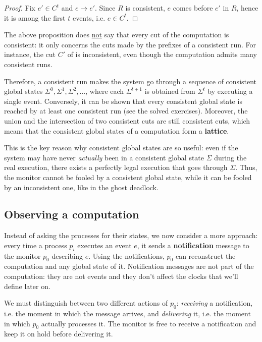 \begin{proof}
  Fix $e' \in C^t$ and $e \to e'$. Since $R$ is consistent, $e$ comes before $e'$ in $R$, hence it is among the first $t$ events, i.e. $e \in C^t$.
\end{proof}

\begin{framedobs}{}
  The above proposition does \underline{not} say that every cut of the computation is consistent: it only concerns the cuts made by the prefixes of a consistent run. For instance, the cut $C'$ of  is inconsistent, even though the computation admits many consistent runs.
\end{framedobs}

Therefore, a consistent run makes the system go through a sequence of consistent global states $\Sigma^0, \Sigma^1, \Sigma^2, \ldots$, where each $\Sigma^{t+1}$ is obtained from $\Sigma^t$ by executing a single event. Conversely, it can be shown that every consistent global state is reached by at least one consistent run (see the solved exercises). Moreover, the union and the intersection of two consistent cuts are still consistent cuts, which means that the consistent global states of a computation form a \textbf{lattice}.

This is the key reason why consistent global states are so useful: even if the system may have never \textit{actually} been in a consistent global state $\Sigma$ during the real execution, there exists a perfectly legal execution that goes through $\Sigma$. Thus, the monitor cannot be fooled by a consistent global state, while it can be fooled by an inconsistent one, like in the ghost deadlock.

\subsection{Observing a computation}

Instead of asking the processes for their states, we now consider a more  approach: every time a process $p_i$ executes an event $e$, it sends a \textbf{notification} message to the monitor $p_0$ describing $e$. Using the notifications, $p_0$ can reconstruct the computation and any global state of it. Notification messages are not part of the computation: they are not events and they don't affect the clocks that we'll define later on.

We must distinguish between two different actions of $p_0$: \textit{receiving} a notification, i.e. the moment in which the message arrives, and \textit{delivering} it, i.e. the moment in which $p_0$ actually processes it. The monitor is free to receive a notification and keep it on hold before delivering it.

